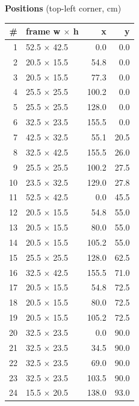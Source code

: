 \documentclass[a4paper,landscape,10pt]{article}
\begin{document}
\begin{minipage}[t]{0.25\textwidth}
\vspace{8pt}
{\bfseries Positions} (top-left corner, cm)\\[2pt]
\tiny
\begin{tabular}{@{}r l r r@{}}
\toprule
\# & frame w $\times$ h & x & y \\
\midrule
1 & 52.5 $\times$ 42.5 & 0.0 & 0.0 \\
2 & 20.5 $\times$ 15.5 & 54.8 & 0.0 \\
3 & 20.5 $\times$ 15.5 & 77.3 & 0.0 \\
4 & 25.5 $\times$ 25.5 & 100.2 & 0.0 \\
5 & 25.5 $\times$ 25.5 & 128.0 & 0.0 \\
6 & 32.5 $\times$ 23.5 & 155.5 & 0.0 \\
7 & 42.5 $\times$ 32.5 & 55.1 & 20.5 \\
8 & 32.5 $\times$ 42.5 & 155.5 & 26.0 \\
9 & 25.5 $\times$ 25.5 & 100.2 & 27.5 \\
10 & 23.5 $\times$ 32.5 & 129.0 & 27.8 \\
11 & 52.5 $\times$ 42.5 & 0.0 & 45.5 \\
12 & 20.5 $\times$ 15.5 & 54.8 & 55.0 \\
13 & 20.5 $\times$ 15.5 & 80.0 & 55.0 \\
14 & 20.5 $\times$ 15.5 & 105.2 & 55.0 \\
15 & 25.5 $\times$ 25.5 & 128.0 & 62.5 \\
16 & 32.5 $\times$ 42.5 & 155.5 & 71.0 \\
17 & 20.5 $\times$ 15.5 & 54.8 & 72.5 \\
18 & 20.5 $\times$ 15.5 & 80.0 & 72.5 \\
19 & 20.5 $\times$ 15.5 & 105.2 & 72.5 \\
20 & 32.5 $\times$ 23.5 & 0.0 & 90.0 \\
21 & 32.5 $\times$ 23.5 & 34.5 & 90.0 \\
22 & 32.5 $\times$ 23.5 & 69.0 & 90.0 \\
23 & 32.5 $\times$ 23.5 & 103.5 & 90.0 \\
24 & 15.5 $\times$ 20.5 & 138.0 & 93.0 \\
\bottomrule
\end{tabular}
\end{minipage}
\clearpage
\end{document}
